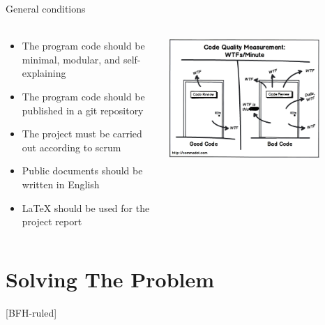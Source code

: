\documentclass[
    ngerman,%
    authorontitle=true,
]{bfhbeamer}
\begin{document}
    \begin{frame}{General conditions}
        \framesubtitle{}
        \begin{columns} %
            \begin{column}{0.5\textwidth} %
                \begin{itemize}
                    \item The program code should be minimal, modular, and self-explaining
                    \item The program code should be published in a git repository
                    \item The project must be carried out according to scrum
                    \item Public documents should be written in English
                    \item LaTeX should be used for the project report
                \end{itemize}
            \end{column}
            \begin{column}{0.4\textwidth} %
                \includegraphics[width=0.8\textwidth]{pictures/clean-code-1}
            \end{column}
        \end{columns}
    \end{frame}



    \section{Solving The Problem}
    [BFH-ruled]
    \frame{\sectionpage}
\end{document}
